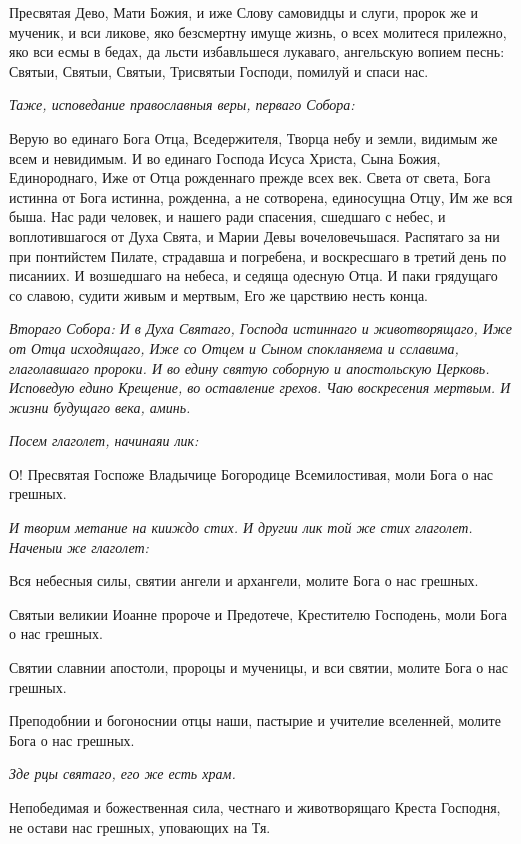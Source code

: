    Пресвятая Дево, Мати Божия, и иже Слову самовидцы и слуги, пророк
же и мученик, и вси ликове, яко безсмертну имуще жизнь, о всех молитеся
прилежно, яко вси есмы в бедах, да льсти избавльшеся лукаваго, ангельскую
вопием песнь: Святыи, Святыи, Святыи, Трисвятыи Господи, помилуй и
спаси нас.


 \itshape Таже, исповедание православныя веры, перваго Собора:\normalfont{}


   Верую во единаго Бога Отца, Вседержителя, Творца небу и земли,
видимым же всем и невидимым. И во единаго Господа Исуса Христа, Сына
Божия, Единороднаго, Иже от Отца рожденнаго прежде всех век. Света от
света, Бога истинна от Бога истинна, рожденна, а не сотворена, единосущна
Отцу, Им же вся быша. Нас ради человек, и нашего ради спасения, сшедшаго
с небес, и воплотившагося от Духа Свята, и Марии Девы вочеловечьшася.
Распятаго за ни при понтийстем Пилате, страдавша и погребена, и
воскресшаго в третий день по писаниих. И возшедшаго на небеса, и седяща
одесную Отца. И паки грядущаго со славою, судити живым и мертвым, Его
же царствию несть конца.


 \itshape Втораго Собора:\normalfont{} И в Духа Святаго, Господа истиннаго и животворящаго,
Иже от Отца исходящаго, Иже со Отцем и Сыном спокланяема и сславима,
глаголавшаго пророки. И во едину святую соборную и апостольскую
Церковь. Исповедую едино Крещение, во оставление грехов. Чаю
воскресения мертвым. И жизни будущаго века, аминь.


 \itshape Посем глаголет, начинаяи лик:\normalfont{}


   О! Пресвятая Госпоже Владычице Богородице Всемилостивая, моли Бога
о нас грешных.


 \itshape И творим метание на кииждо стих. И другии лик той же стих глаголет.
Наченыи же глаголет:\normalfont{}


   Вся небесныя силы, святии ангели и архангели, молите Бога о нас
грешных.


   Святыи великии Иоанне пророче и Предотече, Крестителю Господень,
моли Бога о нас грешных.


   Святии славнии апостоли, пророцы и мученицы, и вси святии, молите
Бога о нас грешных.



   Преподобнии и богоноснии отцы наши, пастырие и учителие вселенней,
молите Бога о нас грешных.


 \itshape Зде рцы святаго, его же есть храм.\normalfont{}


   Непобедимая и божественная сила, честнаго и животворящаго Креста
Господня, не остави нас грешных, уповающих на Тя.


